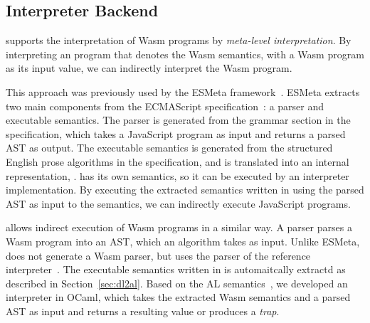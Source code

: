 \subsection{Interpreter Backend}\label{sec:interp} %
\dslname supports the interpretation of Wasm programs by \textit{meta-level interpretation}.
By interpreting an \al program that denotes the Wasm semantics, with
a Wasm program as its input value, we can indirectly interpret the Wasm program.

This approach was previously used by the ESMeta framework~\cite{esmeta,jiset}.
ESMeta extracts two main components from the ECMAScript specification~\cite{ecmascript}:
a parser and executable semantics.
The parser is generated from the grammar section in the specification,
which takes a JavaScript program as input and returns a parsed AST as output.
The executable semantics is generated from the structured English prose algorithms in the specification,
and is translated into an internal representation, \ires.
\ires has its own semantics, so it can be executed by an interpreter implementation.
By executing the extracted semantics written in \ires using the parsed AST as input to the semantics,
we can indirectly execute JavaScript programs.

\dslname allows indirect execution of Wasm programs in a similar way.
A parser parses a Wasm program into an AST, which an \al algorithm takes as input.
Unlike ESMeta, \dslname does not generate a Wasm parser,
but uses the parser of the reference interpreter~\cite{wasmparser}.
The executable semantics written in \al is automaitcally extractd as described in Section~\ref{sec:dl2al}.
Based on the AL semantics~\cite{il-tr}, we developed an \al interpreter in OCaml,
which takes the extracted Wasm semantics and a parsed AST as input
and returns a resulting value or produces a \textit{trap}.

